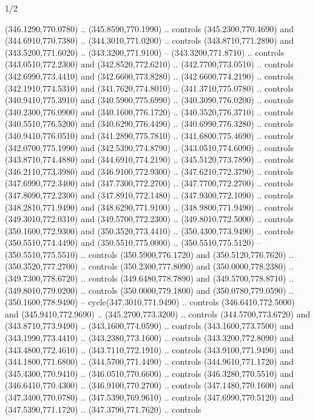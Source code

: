 \begin{flagdescription}{1/2}
\begin{scope}[xshift=0.5\flaglength]
\begin{scope}[scale=0.00745\flagwidth,xshift=-12.1mm,yshift=41.7mm]
\begin{scope}[y=0.80pt, x=0.80pt, yscale=-1, xscale=1, inner sep=0pt, outer sep=0pt]
\begin{scope}[cm={{1.33333,0.0,0.0,-1.33333,(0.0,114.66667)}}]
\begin{scope}[scale=0.100]
  (346.1290,770.0780) .. (345.8590,770.1990) .. controls (345.2300,770.4690) and
  (344.6910,770.7380) .. (344.3010,771.0200) .. controls (343.8710,771.2890) and
  (343.5200,771.6020) .. (343.3200,771.9100) -- (343.3200,771.8710) .. controls
  (343.0510,772.2300) and (342.8520,772.6210) .. (342.7700,773.0510) .. controls
  (342.6990,773.4410) and (342.6600,773.8280) .. (342.6600,774.2190) .. controls
  (342.1910,774.5310) and (341.7620,774.8010) .. (341.3710,775.0780) .. controls
  (340.9410,775.3910) and (340.5900,775.6990) .. (340.3090,776.0200) .. controls
  (340.2300,776.0900) and (340.1600,776.1720) .. (340.3520,776.3710) .. controls
  (340.5510,776.5200) and (340.6290,776.4490) .. (340.6990,776.3280) .. controls
  (340.9410,776.0510) and (341.2890,775.7810) .. (341.6800,775.4690) .. controls
  (342.0700,775.1990) and (342.5390,774.8790) .. (343.0510,774.6090) .. controls
  (343.8710,774.4880) and (344.6910,774.2190) .. (345.5120,773.7890) .. controls
  (346.2110,773.3980) and (346.9100,772.9300) .. (347.6210,772.3790) .. controls
  (347.6990,772.3400) and (347.7300,772.2700) .. (347.7700,772.2700) .. controls
  (347.8090,772.2300) and (347.8910,772.1480) .. (347.9300,772.1090) .. controls
  (348.2810,771.9490) and (348.6290,771.9100) .. (348.9800,771.9490) .. controls
  (349.3010,772.0310) and (349.5700,772.2300) .. (349.8010,772.5000) .. controls
  (350.1600,772.9300) and (350.3520,773.4410) .. (350.4300,773.9490) .. controls
  (350.5510,774.4490) and (350.5510,775.0000) .. (350.5510,775.5120) --
  (350.5510,775.5510) .. controls (350.5900,776.1720) and (350.5120,776.7620) ..
  (350.3520,777.2700) .. controls (350.2300,777.8090) and (350.0000,778.2380) ..
  (349.7300,778.6720) .. controls (349.6480,778.7890) and (349.5700,778.8710) ..
  (349.8010,779.0200) .. controls (350.0000,779.1800) and (350.0780,779.0590) ..
  (350.1600,778.9490) -- cycle(347.3010,771.9490) .. controls
  (346.6410,772.5000) and (345.9410,772.9690) .. (345.2700,773.3200) .. controls
  (344.5700,773.6720) and (343.8710,773.9490) .. (343.1600,774.0590) .. controls
  (343.1600,773.7500) and (343.1990,773.4410) .. (343.2380,773.1600) .. controls
  (343.3200,772.8090) and (343.4800,772.4610) .. (343.7110,772.1910) .. controls
  (343.9100,771.9490) and (344.1800,771.6800) .. (344.5700,771.4490) .. controls
  (344.9610,771.1720) and (345.4300,770.9410) .. (346.0510,770.6600) .. controls
  (346.3280,770.5510) and (346.6410,770.4300) .. (346.9100,770.2700) .. controls
  (347.1480,770.1600) and (347.3400,770.0780) .. (347.5390,769.9610) .. controls
  (347.6990,770.5120) and (347.5390,771.1720) .. (347.3790,771.7620) .. controls

\end{scope}
\end{scope}
\end{scope}
\end{scope}
\end{scope}
\end{flagdescription}
